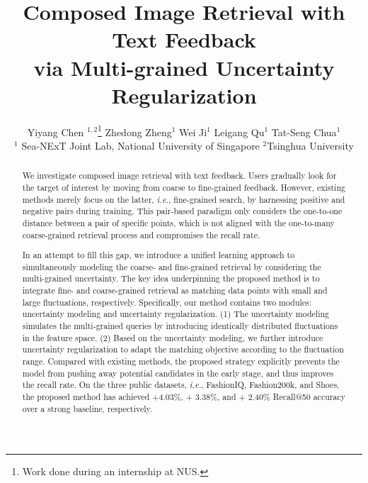\documentclass[10pt,twocolumn,letterpaper]{article}
\def\ie{\emph{i.e.}}
\begin{document}
\title{Composed Image Retrieval with Text Feedback\\ via Multi-grained Uncertainty Regularization}
\author{
    Yiyang Chen ${^{1,2}}$\thanks{Work done during an internship at NUS.} \quad Zhedong Zheng${^1}$ \quad Wei Ji${^1}$ \quad Leigang Qu${^1}$ \quad Tat-Seng Chua${^1}$
    \\
     $^1$ Sea-NExT Joint Lab, National University of Singapore \quad $^2$Tsinghua University 
    }

\maketitle

\begin{abstract}
We investigate composed image retrieval with text feedback.
Users gradually look for the target of interest by moving from coarse to fine-grained feedback.  
However, existing methods merely focus on the latter, \ie, fine-grained search, by harnessing positive and negative pairs during training. This pair-based paradigm only considers the one-to-one distance between a pair of specific points, which is not aligned with the one-to-many coarse-grained retrieval process and compromises the recall rate. 

In an attempt to fill this gap, we introduce a unified learning approach to simultaneously modeling the coarse- and fine-grained retrieval by considering the multi-grained uncertainty. 
The key idea underpinning the proposed method is to integrate fine- and coarse-grained retrieval as matching data points with small and large fluctuations, respectively.
Specifically, our method contains two modules: uncertainty modeling and uncertainty regularization. 
(1) The uncertainty modeling simulates the multi-grained queries by introducing identically distributed fluctuations in the feature space. 
(2) Based on the uncertainty modeling, we further introduce uncertainty regularization to adapt the matching objective according to the fluctuation range.
Compared with existing methods, the proposed strategy explicitly prevents the model from pushing away potential candidates in the early stage, and thus improves the recall rate.  
On the three public datasets, \ie, FashionIQ, Fashion200k, and Shoes, the proposed method has achieved +4.03\%, + 3.38\%, and + 2.40\% Recall@50 accuracy over a strong baseline, respectively. 
\end{abstract}
\end{document}
